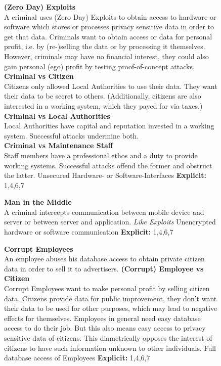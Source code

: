 \begin{landscape}
\begin{figure}
\centering
\begin{ThreatTable}

\ThreatTableContentRow
{\textbf{(Zero Day) Exploits}
\\A criminal uses (Zero Day) Exploits to obtain access to hardware or software which stores or processes
privacy sensitive data in order to get that data.}
{Criminals want to obtain access or data for personal profit, i.e. by (re-)selling the data or  by processing it themselves. 
However, criminals may have no financial interest, they could also gain personal (ego) profit by testing proof-of-concept attacks.
\\\textbf{Criminal vs Citizen}
\\Citizens only allowed Local Authorities to use their data. They want their data to be secret to others. (Additionally, citizens are
also interested in a working system, which they payed for via taxes.)
\\\textbf{Criminal vs Local Authorities}
\\Local Authorities have capital and reputation invested in a working system. Successful attacks undermine both.
\\\textbf{Criminal vs Maintenance Staff}
\\Staff members have a professional ethos and a duty to provide working systems. Successful attacks offend the former and obstruct the latter.}
{Unsecured Hardware- or Software-Interfaces}
{\textbf{Explicit:} 1,4,6,7}

\ThreatTableContentRow
{\textbf{Man in the Middle} 
\\A criminal intercepts communication between mobile device and server or between server and application.}
{\textit{Like Exploits}}
{Unencrypted hardware or software communication}
{\textbf{Explicit:} 1,4,6,7}

\ThreatTableContentRow
{\textbf{Corrupt Employees} 
\\ An employee abuses his database access to obtain private citizen data in order to sell it to advertisers.}
{\textbf{(Corrupt) Employee vs Citizen} 
\\ Corrupt Employees want to make personal profit by selling citizen data. 
Citizens provide data for public improvement, they don't want their data to be used for other purposes, which
may lead to negative effects for themselves.
Employees in general need easy database access to do their job. But this also means easy access to privacy
sensitive data of citizens. This diametrically opposes the interest of citizens to have such information unknown
to other individuals.}
{Full database access of Employees}
{\textbf{Explicit:} 1,4,6,7}


\end{ThreatTable}
\end{figure}
\end{landscape}
